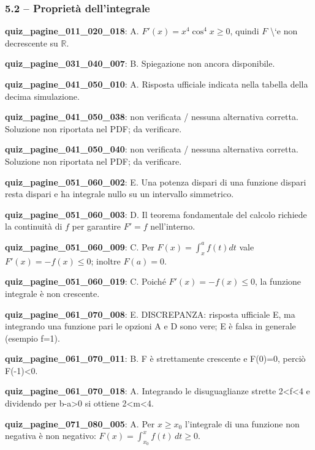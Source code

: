 \documentclass[11pt,a4paper]{article}
\newcounter{quiz}
\begin{document}
\subsubsection*{5.2 -- Proprietà dell’integrale}
\noindent\textbf{quiz\_pagine\_011\_020\_018}: A. $F\prime(x)=x^4\cos^4x\ge0$, quindi $F$ \textbackslash{}`e non decrescente su $\mathbb R$.\par\medskip
\noindent\textbf{quiz\_pagine\_031\_040\_007}: B. Spiegazione non ancora disponibile.\par\medskip
\noindent\textbf{quiz\_pagine\_041\_050\_010}: A. Risposta ufficiale indicata nella tabella della decima simulazione.\par\medskip
\noindent\textbf{quiz\_pagine\_041\_050\_038}: non verificata / nessuna alternativa corretta. Soluzione non riportata nel PDF; da verificare.\par\medskip
\noindent\textbf{quiz\_pagine\_041\_050\_040}: non verificata / nessuna alternativa corretta. Soluzione non riportata nel PDF; da verificare.\par\medskip
\noindent\textbf{quiz\_pagine\_051\_060\_002}: E. Una potenza dispari di una funzione dispari resta dispari e ha integrale nullo su un intervallo simmetrico.\par\medskip
\noindent\textbf{quiz\_pagine\_051\_060\_003}: D. Il teorema fondamentale del calcolo richiede la continuità di $f$ per garantire $F\prime=f$ nell'interno.\par\medskip
\noindent\textbf{quiz\_pagine\_051\_060\_009}: C. Per $F(x)=\int_x^a f(t)dt$ vale $F\prime(x)=-f(x)\le0$; inoltre $F(a)=0$.\par\medskip
\noindent\textbf{quiz\_pagine\_051\_060\_019}: C. Poiché $F\prime(x)=-f(x)\le0$, la funzione integrale è non crescente.\par\medskip
\noindent\textbf{quiz\_pagine\_061\_070\_008}: E. DISCREPANZA: risposta ufficiale E, ma integrando una funzione pari le opzioni A e D sono vere; E è falsa in generale (esempio f=1).\par\medskip
\noindent\textbf{quiz\_pagine\_061\_070\_011}: B. F è strettamente crescente e F(0)=0, perciò F(-1)<0.\par\medskip
\noindent\textbf{quiz\_pagine\_061\_070\_018}: A. Integrando le disuguaglianze strette 2<f<4 e dividendo per b-a>0 si ottiene 2<m<4.\par\medskip
\noindent\textbf{quiz\_pagine\_071\_080\_005}: A. Per $x\ge x_0$ l'integrale di una funzione non negativa è non negativo: $F(x)=\int_{x_0}^x f(t)\,dt\ge0$.\par\medskip
\end{document}
